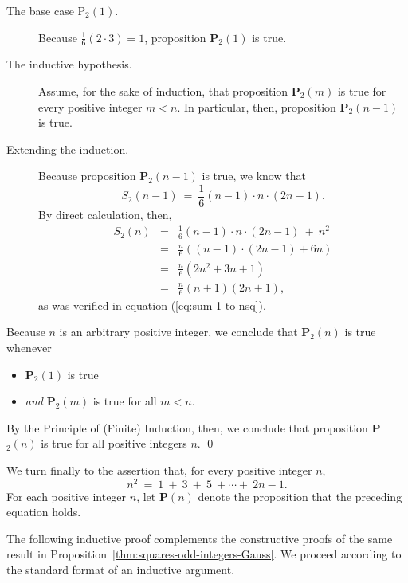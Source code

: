 \begin{description}
\item[{\sf The base case P$_2(1)$}.]
%
Because ${\displaystyle \frac{1}{6} (2 \cdot 3)} = 1$, proposition {\bf
    P}$_2(1)$ is true.

\item[{\sf The inductive hypothesis}.]
%
Assume, for the sake of induction, that proposition {\bf P}$_2(m)$ is
true for every positive integer $m < n$.  In particular, then,
proposition {\bf P}$_2(n-1)$ is true.

\item[{\sf Extending the induction}.]
%
Because proposition {\bf P}$_2(n-1)$ is true, we know that
\[ S_2(n-1) \ = \
\frac{1}{6} (n-1) \cdot n \cdot (2n-1).
\]
By direct calculation, then,
\begin{eqnarray*}
S_2(n) & = &
\frac{1}{6} (n-1) \cdot n \cdot (2n-1) \ + \ n^2 \\
  & = &
\frac{n}{6} \left( (n-1) \cdot (2n-1) + 6n \right) \\
  & = & \frac{n}{6} \left( 2n^2 +3n + 1 \right) \\ 
  & = & \frac{n}{6} (n+1)(2n+1),
\end{eqnarray*}
as was verified in equation (\ref{eq:sum-1-to-nsq}).
\end{description}
Because $n$ is an arbitrary positive integer, we conclude that
{\bf P}$_2(n)$ is true whenever
\begin{itemize}
\item
{\bf P}$_2(1)$ is true
\item
{\em and}
{\bf P}$_2(m)$ is true for all $m < n$.
\end{itemize}
By the Principle of (Finite) Induction, then, we conclude that
proposition {\bf P}$_2(n)$ is true for all positive integers $n$.
\qed


\bigskip

%
We turn finally to the assertion that, for every positive integer $n$,
\[ n^2 \ = \ 1 \ + \  3 \ + \ 5 \ + \cdots + \ 2n-1. \]
For each positive integer $n$, let {\bf P}$(n)$ denote the proposition
that the preceding equation holds.

The following inductive proof complements the constructive proofs of
the same result in Proposition~\ref{thm:squares-odd-integers-Gauss}.
We proceed according to the standard format of an inductive argument.

